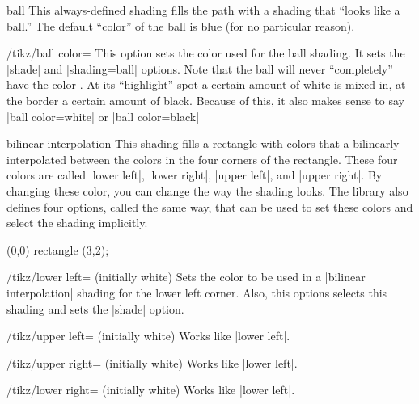 \begin{shading}{ball}
  This always-defined shading fills the path with a shading that ``looks like a
  ball.'' The default ``color'' of the ball is blue (for no
  particular reason).
  
  \begin{key}{/tikz/ball color=}
    This option sets the color used for the ball shading. It sets the
    |shade| and |shading=ball| options. Note that the ball will never
    ``completely'' have the color . At its ``highlight'' spot
    a certain amount of white is mixed in, at the border a certain
    amount of black. Because of this, it also makes sense to say
    |ball color=white| or |ball color=black|
    
\begin{codeexample}[]
\end{codeexample}
  \end{key}
\end{shading}



\begin{shading}{bilinear interpolation}
  This shading fills a rectangle with colors that a bilinearly
  interpolated between the colors in the four corners of the
  rectangle. These four colors are called |lower left|, |lower right|,
  |upper left|, and |upper right|. By changing these color, you can
  change the way the shading looks. The library also defines four
  options, called the same way, that can be used to set these colors
  and select the shading implicitly.

\begin{codeexample}[]
\tikz
  \shade[upper left=red,upper right=green,
         lower left=blue,lower right=yellow]
    (0,0) rectangle (3,2);
\end{codeexample}

  \begin{key}{/tikz/lower left= (initially white)}
    Sets the color to be used in a |bilinear interpolation| shading
    for the lower left corner. Also, this options selects this shading
    and sets the |shade| option.
  \end{key}

  \begin{key}{/tikz/upper left= (initially white)}
    Works like |lower left|.
  \end{key}
  \begin{key}{/tikz/upper right= (initially white)}
    Works like |lower left|.
  \end{key}
  \begin{key}{/tikz/lower right= (initially white)}
    Works like |lower left|.
  \end{key}
\end{shading}


